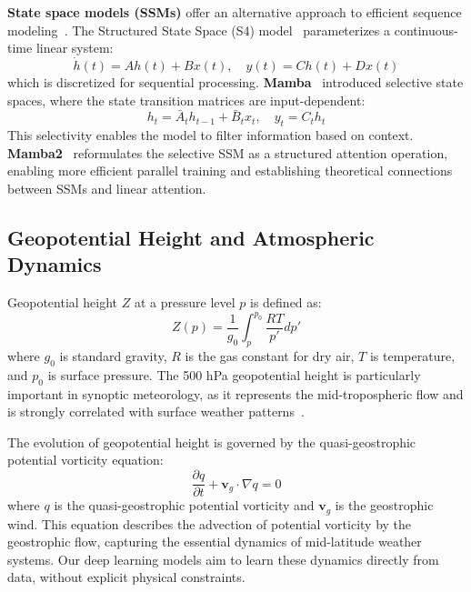 \documentclass[runningheads]{llncs}
\begin{document}
\textbf{State space models (SSMs)} offer an alternative approach to efficient sequence modeling~\cite{gu2022efficiently}. The Structured State Space (S4) model~\cite{gu2022efficiently} parameterizes a continuous-time linear system:
\begin{equation}
    \dot{h}(t) = Ah(t) + Bx(t), \quad y(t) = Ch(t) + Dx(t)
\end{equation}
which is discretized for sequential processing. \textbf{Mamba}~\cite{gu2024mamba} introduced selective state spaces, where the state transition matrices are input-dependent:
\begin{equation}
    h_t = \bar{A}_t h_{t-1} + \bar{B}_t x_t, \quad y_t = C_t h_t
\end{equation}
This selectivity enables the model to filter information based on context. \textbf{Mamba2}~\cite{dao2024transformers} reformulates the selective SSM as a structured attention operation, enabling more efficient parallel training and establishing theoretical connections between SSMs and linear attention.

\subsection{Geopotential Height and Atmospheric Dynamics}

Geopotential height $Z$ at a pressure level $p$ is defined as:
\begin{equation}
    Z(p) = \frac{1}{g_0} \int_p^{p_0} \frac{RT}{p'} dp'
\end{equation}
where $g_0$ is standard gravity, $R$ is the gas constant for dry air, $T$ is temperature, and $p_0$ is surface pressure. The 500 hPa geopotential height is particularly important in synoptic meteorology, as it represents the mid-tropospheric flow and is strongly correlated with surface weather patterns~\cite{holton2013introduction}.

The evolution of geopotential height is governed by the quasi-geostrophic potential vorticity equation:
\begin{equation}
    \frac{\partial q}{\partial t} + \mathbf{v}_g \cdot \nabla q = 0
\end{equation}
where $q$ is the quasi-geostrophic potential vorticity and $\mathbf{v}_g$ is the geostrophic wind. This equation describes the advection of potential vorticity by the geostrophic flow, capturing the essential dynamics of mid-latitude weather systems. Our deep learning models aim to learn these dynamics directly from data, without explicit physical constraints.
\end{document}
